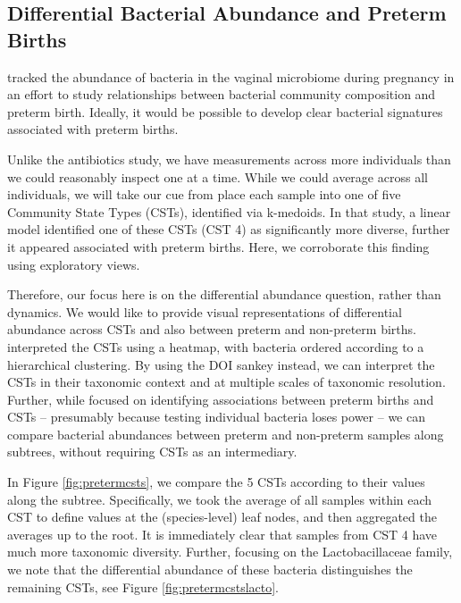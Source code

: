 \documentclass[12pt]{article}
\begin{document}
\subsection{Differential Bacterial Abundance and Preterm
Births}\label{differential-bacterial-abundance-and-preterm-births}

\citet{digiulio2015temporal}
tracked the abundance of bacteria in the vaginal microbiome during
pregnancy in an effort to study relationships between bacterial
community composition and preterm birth. Ideally, it would be possible
to develop clear bacterial signatures associated with preterm births.

Unlike the antibiotics study, we have measurements across more
individuals than we could reasonably inspect one at a time. While we
could average across all individuals, we will take our cue from
\citep{digiulio2015temporal}
place each sample into one of five Community State Types (CSTs),
identified via k-medoids. In that study, a linear model identified one
of these CSTs (CST 4) as significantly more diverse, further it appeared
associated with preterm births. Here, we corroborate this finding using
exploratory views.

Therefore, our focus here is on the differential abundance question,
rather than dynamics. We would like to provide visual representations of
differential abundance across CSTs and also between preterm and non-preterm
births. \citet{digiulio2015temporal} interpreted the CSTs using a heatmap, with
bacteria ordered according to a hierarchical clustering. By using the DOI sankey
instead, we can interpret the CSTs in their taxonomic context and at multiple
scales of taxonomic resolution. Further, while
\citet{digiulio2015temporal} focused on identifying associations between
preterm births and CSTs -- presumably because testing individual bacteria loses
power -- we can compare bacterial abundances between preterm and non-preterm
samples along subtrees, without requiring CSTs as an intermediary.

In Figure \ref{fig:pretermcsts}, we compare the 5 CSTs according to
their values along the subtree. Specifically, we took the average of all
samples within each CST to define values at the (species-level) leaf
nodes, and then aggregated the averages up to the root. It is
immediately clear that samples from CST 4 have much more taxonomic
diversity. Further, focusing on the Lactobacillaceae family, we note
that the differential abundance of these bacteria distinguishes the
remaining CSTs, see Figure \ref{fig:pretermcstslacto}.
\end{document}
